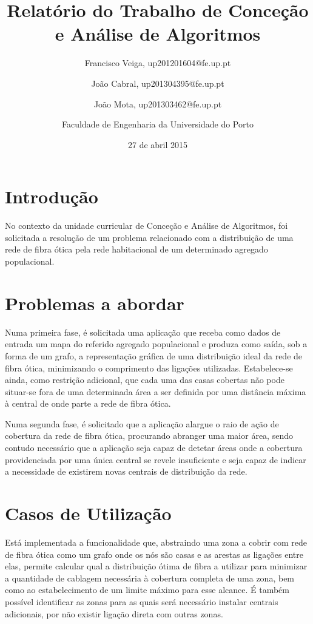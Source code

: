 \documentclass[a4paper,12pt,titlepage]{article}
\begin{document}
\title{Relatório do Trabalho de Conceção e Análise de Algoritmos}
\date{27 de abril 2015}
\author{Francisco Veiga, up201201604@fe.up.pt
 \and João Cabral, up201304395@fe.up.pt
 \and  João Mota, up201303462@fe.up.pt\linebreak
 \and Faculdade de Engenharia da Universidade do Porto}
%
\maketitle
\tableofcontents
\newpage
\section{Introdução}

No contexto da unidade curricular de Conceção e Análise de Algoritmos, foi solicitada a resolução de um problema relacionado com a distribuição de uma rede de fibra ótica pela rede habitacional de um determinado agregado populacional.

\section{Problemas a abordar} 
Numa primeira fase, é solicitada uma aplicação que receba como dados de entrada um mapa do referido agregado populacional e produza como saída, sob a forma de um grafo, a representação gráfica de uma distribuição ideal da rede de fibra ótica, minimizando o comprimento das ligações utilizadas. Estabelece-se ainda, como restrição adicional, que cada uma das casas cobertas não pode situar-se fora de uma determinada área a ser definida por uma distância máxima à central de onde parte a rede de fibra ótica.
 
Numa segunda fase, é solicitado que a aplicação alargue o raio de ação de cobertura da rede de fibra ótica, procurando abranger uma maior área, sendo contudo necessário que a aplicação seja capaz de detetar áreas onde a cobertura providenciada por uma única central se revele insuficiente e seja capaz de indicar a necessidade de existirem novas centrais de distribuição da rede.
\section{Casos de Utilização}
Está implementada a funcionalidade que, abstraindo uma zona a cobrir com rede de fibra ótica como um grafo onde os nós são casas e as arestas as ligações entre elas, permite calcular qual a distribuição ótima de fibra a utilizar para minimizar a quantidade de cablagem necessária à cobertura completa de uma zona, bem como ao estabelecimento de um limite máximo para esse alcance. É também possível identificar as zonas para as quais será necessário instalar centrais adicionais, por não existir ligação direta com outras zonas.
\end{document}
